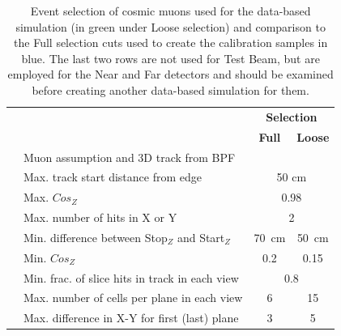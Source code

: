 \begin{table}[!ht]
\centering
\caption[Overview of the event selection for the data-based simulation]{Event selection of cosmic muons used for the data-based simulation (in green under Loose selection) and comparison to the Full selection cuts used to create the calibration samples in blue. The last two rows are not used for Test Beam, but are employed for the Near and Far detectors and should be examined before creating another data-based simulation for them.}
\begin{tabular}{clcc}
& \multirow{2}{*}{\centering{\textbf{Cut}}} & \multicolumn{2}{c}{\textbf{Selection}}\\
& & \cellcolor[HTML]{3166FF}\textbf{Full} & \cellcolor[HTML]{32CB00}\textbf{Loose}\\\hline
                                   & Muon assumption and 3D track from BPF         &                                             &                                          \\
                                   & Max. track start distance from edge                       & \multicolumn{2}{c}{50 cm}                                                                 \\
                                   & Max. $Cos_{Z}$                                            & \multicolumn{2}{c}{0.98}                                                               \\ \hline
                                   & Max. number of hits in X or Y                             & \multicolumn{2}{c}{\cellcolor[HTML]{FFFFFF}2}                                          \\
                                   & Min. difference between Stop$_{Z}$ and Start$_{Z}$        & \cellcolor[HTML]{3166FF}70~cm                 & \cellcolor[HTML]{32CB00}50~cm             \\
                                   & Min. $Cos_{Z}$ & \cellcolor[HTML]{3166FF}0.2                 & \cellcolor[HTML]{32CB00}0.15             \\
                                   & Min. frac. of slice hits in track in each view    & \multicolumn{2}{c}{0.8}                                                                \\
                                   & Max. number of cells per plane in each view               & \cellcolor[HTML]{3166FF}6                   & \cellcolor[HTML]{32CB00}15               \\
                                   & Max. difference in X-Y for first (last) plane     & \cellcolor[HTML]{3166FF}3                   & \cellcolor[HTML]{32CB00}5                \\

\end{tabular}
\end{table}
